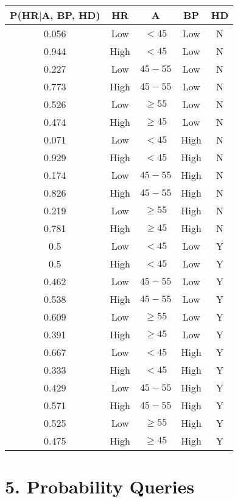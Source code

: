 \documentclass[a4paper,10pt]{report}
\begin{document}
\begin{tabular}{|c|c|c|c|c|}\hline
P(HR$|$A, BP, HD) & HR & A & BP & HD  \\ \hline\hline
0.056 & Low & $< 45$  & Low & N\\ \hline
0.944 & High & $< 45$  & Low & N\\ \hline
0.227 & Low & $45-55$  & Low & N\\ \hline
0.773 & High & $45-55$  & Low & N\\ \hline
0.526 & Low & $\ge 55$  & Low & N\\ \hline
0.474 & High & $\ge 45$  & Low & N\\ \hline
0.071 & Low & $< 45$  & High & N\\ \hline
0.929 & High & $< 45$  & High & N\\ \hline
0.174 & Low & $45-55$  & High & N\\ \hline
0.826 & High & $45-55$  & High & N\\ \hline
0.219 & Low & $\ge 55$  & High& N\\ \hline
0.781 & High & $\ge 45$  & High & N\\ \hline
0.5 & Low & $< 45$  & Low & Y\\ \hline
0.5 & High & $< 45$  & Low & Y\\ \hline
0.462 & Low & $45-55$  & Low & Y\\ \hline
0.538 & High & $45-55$  & Low & Y\\ \hline
0.609 & Low & $\ge 55$  & Low & Y\\ \hline
0.391 & High & $\ge 45$  & Low & Y\\ \hline
0.667 & Low & $< 45$  & High & Y\\ \hline
0.333 & High & $< 45$  & High & Y\\ \hline
0.429 & Low & $45-55$  & High & Y\\ \hline
0.571 & High & $45-55$  & High & Y\\ \hline
0.525 & Low & $\ge 55$  & High& Y\\ \hline
0.475 & High & $\ge 45$  & High & Y\\ \hline
\end{tabular}
\vspace{1em}



\section*{5. Probability Queries}
\end{document}
